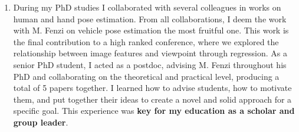 \documentclass[10pt, oneside,english]{article}
\begin{document}
\begin{enumerate}
\vspace{0.6cm}

\item {}
\vspace{0.2cm}

During my PhD studies I collaborated with several colleagues in works on human and hand pose estimation. From all collaborations, I deem the work with M. Fenzi on vehicle pose estimation the most fruitful one. This work is the final contribution to a high ranked conference, where we explored the relationship between image features and viewpoint through regression. 
As a senior PhD student, I acted as a postdoc, advising M. Fenzi throughout his PhD and collaborating on the theoretical and practical level, producing a total of 5 papers together. I learned how to advise students, how to motivate them, and put together their ideas to create a novel and solid approach for a specific goal. This experience was {\bf key for my education as a scholar and group leader}. 





\end{enumerate}


\end{document}
